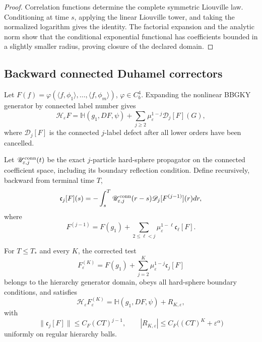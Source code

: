 \begin{proof}
Correlation functions determine the complete symmetric Liouville law.
Conditioning at time \(s\), applying the linear Liouville tower, and taking the
normalized logarithm gives the identity.  The factorial expansion and the
analytic norm show that the conditional exponential functional has coefficients
bounded in a slightly smaller radius, proving closure of the declared domain.
\end{proof}

\subsection{Backward connected Duhamel correctors}

Let \(F(f)=\varphi(\langle f,\phi_1\rangle,\ldots,
\langle f,\phi_m\rangle)\), \(\varphi\in C_b^4\).  Expanding the nonlinear
BBGKY generator by connected label number gives
\[
 \mathscr H_\varepsilon F
 =\mathbb H(g_1,DF,\psi)+
 \sum_{j\ge2}\mu_\varepsilon^{1-j}\mathscr D_j[F](G),
\]
where \(\mathscr D_j[F]\) is the connected \(j\)-label defect after all lower
orders have been cancelled.

Let \(\mathscr U_{\varepsilon,j}^{\rm conn}(t)\) be the exact
\(j\)-particle hard-sphere propagator on the connected coefficient space,
including its boundary reflection condition.  Define recursively, backward
from terminal time \(T\),
\[
 \mathfrak c_j[F](s)
 =-\int_s^T
 \mathscr U_{\varepsilon,j}^{\rm conn}(r-s)
 \mathscr D_j[F^{(j-1)}](r)dr,
\]
where
\[
 F^{(j-1)}=F(g_1)+
 \sum_{2\le\ell<j}\mu_\varepsilon^{1-\ell}
 \mathfrak c_\ell[F].
\]

\begin{lemma}
\label{lem:r3-b4-corrector}
For \(T\le T_*\) and every \(K\), the corrected test
\[
 F_\varepsilon^{(K)}
 =F(g_1)+\sum_{j=2}^K\mu_\varepsilon^{1-j}
 \mathfrak c_j[F]
\]
belongs to the hierarchy generator domain, obeys all hard-sphere boundary
conditions, and satisfies
\[
 \mathscr H_\varepsilon F_\varepsilon^{(K)}
 =\mathbb H(g_1,DF,\psi)+R_{K,\varepsilon},
\]
with
\[
 \|\mathfrak c_j[F]\|\le C_F(CT)^{j-1},
 \qquad
 |R_{K,\varepsilon}|
 \le C_F\big((CT)^K+\varepsilon^\alpha\big)
\]
uniformly on regular hierarchy balls.
\end{lemma}

